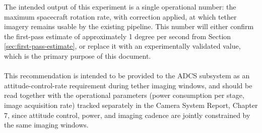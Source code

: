 The intended output of this experiment is a single operational number: the maximum spacecraft rotation rate, with correction applied, at which tether imagery remains usable by the existing pipeline. This number will either confirm the first-pass estimate of approximately 1 degree per second from Section \ref{sec:first-pass-estimate}, or replace it with an experimentally validated value, which is the primary purpose of this document.
\\\\
This recommendation is intended to be provided to the ADCS subsystem as an attitude-control-rate requirement during tether imaging windows, and should be read together with the operational parameters (power consumption per stage, image acquisition rate) tracked separately in the Camera System Report, Chapter 7, since attitude control, power, and imaging cadence are jointly constrained by the same imaging windows.
